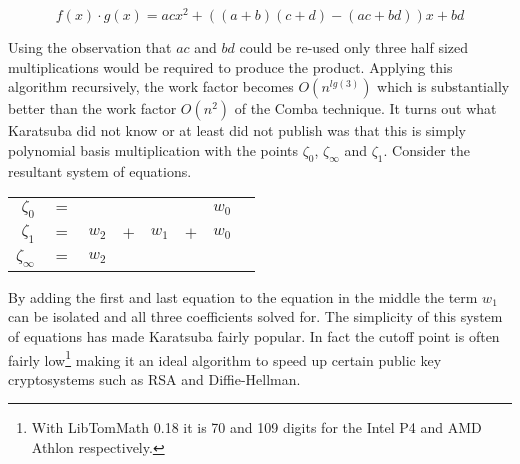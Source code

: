 \documentclass[b5paper]{book}
\begin{document}
\begin{equation}
f(x) \cdot g(x) = acx^2 + ((a + b)(c + d) - (ac + bd))x + bd
\end{equation}

Using the observation that $ac$ and $bd$ could be re-used only three half sized multiplications would be required to produce the product.  Applying
this algorithm recursively, the work factor becomes $O(n^{lg(3)})$ which is substantially better than the work factor $O(n^2)$ of the Comba technique.  It turns 
out what Karatsuba did not know or at least did not publish was that this is simply polynomial basis multiplication with the points 
$\zeta_0$, $\zeta_{\infty}$ and $\zeta_{1}$.  Consider the resultant system of equations.

\begin{center}
\begin{tabular}{rcrcrcrc}
$\zeta_{0}$ &      $=$ &  &  &  & & $w_0$ \\
$\zeta_{1}$ &      $=$ & $w_2$ & $+$ & $w_1$ & $+$ & $w_0$ \\
$\zeta_{\infty}$ & $=$ & $w_2$ &  & &  & \\
\end{tabular}
\end{center}

By adding the first and last equation to the equation in the middle the term $w_1$ can be isolated and all three coefficients solved for.  The simplicity
of this system of equations has made Karatsuba fairly popular.  In fact the cutoff point is often fairly low\footnote{With LibTomMath 0.18 it is 70 and 109 digits for the Intel P4 and AMD Athlon respectively.}
making it an ideal algorithm to speed up certain public key cryptosystems such as RSA and Diffie-Hellman.  
\end{document}
